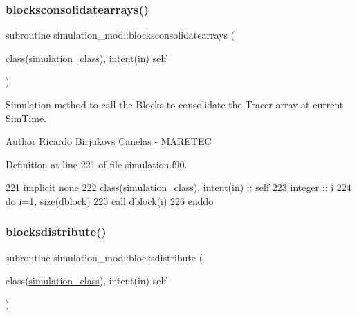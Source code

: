 \subsubsection{\texorpdfstring{blocksconsolidatearrays()}{blocksconsolidatearrays()}}
{\footnotesize\ttfamily subroutine simulation\+\_\+mod\+::blocksconsolidatearrays (\begin{DoxyParamCaption}\item[{class(\mbox{\hyperlink{structsimulation__mod_1_1simulation__class}{simulation\+\_\+class}}), intent(in)}]{self }\end{DoxyParamCaption})\hspace{0.3cm}{\ttfamily [private]}}



Simulation method to call the Blocks to consolidate the Tracer array at current Sim\+Time. 

\begin{DoxyAuthor}{Author}
Ricardo Birjukovs Canelas -\/ M\+A\+R\+E\+T\+EC 
\end{DoxyAuthor}


Definition at line 221 of file simulation.\+f90.


\begin{DoxyCode}
221         \textcolor{keywordtype}{implicit none}
222         \textcolor{keywordtype}{class}(simulation\_class), \textcolor{keywordtype}{intent(in)} :: self        
223         \textcolor{keywordtype}{integer} :: i
224         \textcolor{keywordflow}{do} i=1, \textcolor{keyword}{size}(dblock)
225             \textcolor{keyword}{call }dblock(i)%
226 \textcolor{keywordflow}{        enddo}
\end{DoxyCode}
\mbox{\label{namespacesimulation__mod_a058892630af07fc0fe8a4bffec531c6a}} 
\subsubsection{\texorpdfstring{blocksdistribute()}{blocksdistribute()}}
{\footnotesize\ttfamily subroutine simulation\+\_\+mod\+::blocksdistribute (\begin{DoxyParamCaption}\item[{class(\mbox{\hyperlink{structsimulation__mod_1_1simulation__class}{simulation\+\_\+class}}), intent(in)}]{self }\end{DoxyParamCaption})\hspace{0.3cm}{\ttfamily [private]}}



